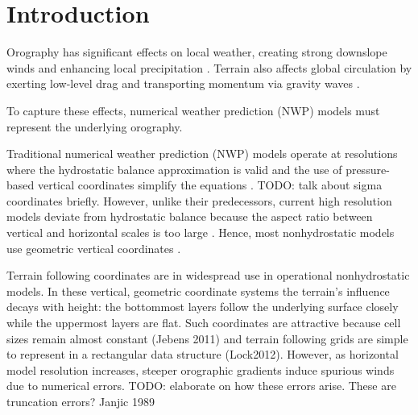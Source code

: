 \chapter{Introduction}


Orography has significant effects on local weather, creating strong downslope winds and enhancing local precipitation \autocite{TODO}.  Terrain also affects global circulation by exerting low-level drag \autocite{lottmiller1997} and transporting momentum via gravity waves \autocite{mcfarlane1987}.

To capture these effects, numerical weather prediction (NWP) models must represent the underlying orography.   

Traditional numerical weather prediction (NWP) models operate at resolutions where the hydrostatic balance approximation is valid and the use of pressure-based vertical coordinates simplify the equations \autocite{eliassen1949}.  TODO: talk about sigma coordinates briefly.  However, unlike their predecessors, current high resolution models deviate from hydrostatic balance because the aspect ratio between vertical and horizontal scales is too large \autocite{daley1988}.  Hence, most nonhydrostatic models use geometric vertical coordinates \autocite{steppeler2003}.


Terrain following coordinates are in widespread use in operational nonhydrostatic models.  In these vertical, geometric coordinate systems the terrain's influence decays with height: the bottommost layers follow the underlying surface closely while the uppermost layers are flat.  Such coordinates are attractive because cell sizes remain almost constant (Jebens 2011) and terrain following grids are simple to represent in a rectangular data structure (Lock2012).  However, as horizontal model resolution increases, steeper orographic gradients induce spurious winds due to numerical errors. \autocite{TODO}  TODO: elaborate on how these errors arise.  These are truncation errors?  Janjic 1989

